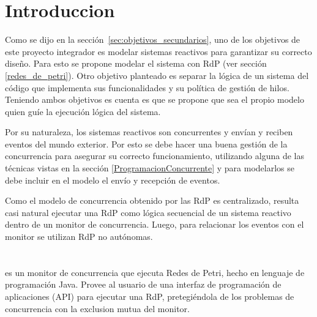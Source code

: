 \section{Introduccion}
\label{sec:petri_concurrency_monitor_intro}
Como se dijo en la sección~\ref{sec:objetivos_secundarios}, uno de los
objetivos de este proyecto integrador es modelar sistemas reactivos para garantizar su
correcto diseño.
Para esto se propone modelar el sistema con RdP (ver sección \ref{redes_de_petri}).
Otro objetivo planteado es separar la lógica de un sistema del código que
implementa sus funcionalidades y su política de gestión de hilos.
Teniendo ambos objetivos es cuenta es que se propone que sea el propio modelo
quien guíe la ejecución lógica del sistema.

Por su naturaleza, los sistemas reactivos son concurrentes y envían y reciben
eventos del mundo exterior.
Por esto se debe hacer una buena gestión de la concurrencia para asegurar su correcto
funcionamiento, utilizando alguna de las técnicas vistas en
la sección \ref{ProgramacionConcurrente} y para modelarlos se debe incluir en
el modelo el envío y recepción de eventos.

Como el modelo de concurrencia obtenido por las RdP es centralizado, resulta
casi natural ejecutar una RdP como lógica secuencial de un sistema reactivo
dentro de un monitor de concurrencia. Luego, para relacionar los eventos con el
monitor se utilizan RdP no autónomas.

\section{\javapetriconcurrencymonitor}
\label{sec:java_petri_concurrency_monitor}

\javapetriconcurrencymonitor es un monitor de concurrencia que ejecuta Redes
de Petri, hecho en lenguaje de programación Java.
Provee al usuario de una interfaz de programación de aplicaciones (API) para
ejecutar una RdP, pretegiéndola de los problemas de concurrencia con la
exclusion mutua del monitor.

